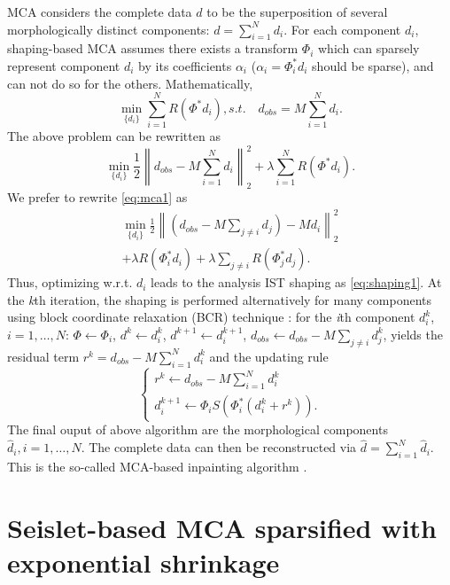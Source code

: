 MCA considers the complete data $d$ to be the superposition of several morphologically distinct components: $d=\sum_{i=1}^Nd_i$. For each component $d_i$, shaping-based MCA assumes there exists a transform $\Phi_i$ which can sparsely represent component $d_i$ by its coefficients $\alpha_i$ ($\alpha_i=\Phi_i^{*}d_i$ should be sparse), and can not do so for the others. Mathematically,
\begin{equation}\label{eq:mca_un}
  \min_{\{d_i\}}\sum_{i=1}^{N}R(\Phi^{*}d_i), s.t.\quad  d_{obs}=M\sum_{i=1}^{N}d_i.
\end{equation}
The above problem can be rewritten as
\begin{equation}\label{eq:mca1}
  \min_{\{d_i\}}\frac{1}{2}\left\|d_{obs}-M\sum_{i=1}^Nd_i\right\|_2^2+\lambda \sum_{i=1}^NR(\Phi^{*}d_i).
\end{equation}
We prefer to rewrite \eqref{eq:mca1} as
\begin{eqnarray}
  \min_{\{d_i\}}\frac{1}{2}\left\|\left(d_{obs}-M\sum_{j\neq i}d_j\right)-Md_i\right\|_2^2 \nonumber\\
   +\lambda R(\Phi_i^{*}d_i)+\lambda \sum_{j\neq i}R(\Phi_j^{*}d_j).
\end{eqnarray}
Thus, optimizing w.r.t. $d_i$ leads to the analysis IST shaping as \eqref{eq:shaping1}. At the \emph{k}th iteration, the shaping is performed alternatively for many components using block coordinate relaxation (BCR) technique \citep{bruce1998block}: for the \emph{i}th component $d_i^{k}$, $i=1,\ldots,N$: $\Phi\leftarrow \Phi_i$, $d^{k}\leftarrow d_i^{k}$, $d^{k+1}\leftarrow d_i^{k+1}$, $d_{obs}\leftarrow d_{obs}-M\sum_{j\neq i}d_j^{k}$, yields the residual term $r^{k}=d_{obs}-M\sum_{i=1}^N d_i^{k}$ and the updating rule
\begin{equation}\label{eq:mca2}
  \left\{
  \begin{array}{l}
    r^{k}\leftarrow d_{obs}-M\sum_{i=1}^N d_i^{k}  \\
    d_i^{k+1}\leftarrow \Phi_i S(\Phi_i^{*}(d_i^{k}+r^{k})).
  \end{array}
  \right.
\end{equation}
The final ouput of above algorithm are the morphological components $\hat{d}_i,i=1,\ldots,N$. The complete data can then be reconstructed via $\hat{d}=\sum_{i=1}^N \hat{d}_i$.
This is the so-called MCA-based inpainting algorithm \citep{Elad2005}.


\section{Seislet-based MCA sparsified with exponential shrinkage}

